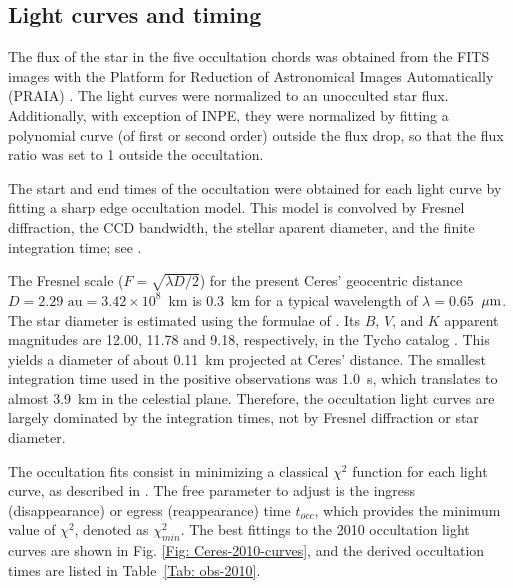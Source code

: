 \documentclass[useAMS,usenatbib]{mn2e}
\begin{document}
\subsection{Light curves and timing \label{Sec: light-curve-2010}}

The flux of the star in the five occultation chords was obtained from the FITS images with the Platform for Reduction of Astronomical Images Automatically (PRAIA) \citep{2011gfun.conf...85A}. The light curves were normalized to an unocculted star flux. Additionally, with exception of INPE, they were normalized by fitting a polynomial curve (of first or second order) outside the flux drop, so that the flux ratio was set to 1 outside the occultation.

The start and end times of the occultation were obtained for each light curve by fitting a sharp edge occultation model. This model is convolved by Fresnel diffraction, the CCD bandwidth, the stellar aparent diameter, and the finite integration time; see \cite{Widemann2009}.

The Fresnel scale ($F = \sqrt{\lambda D/2}$) for the present Ceres' geocentric distance $D = 2.29 \text{ au} = 3.42 \times 10^{8}$~km is 0.3~km for a typical wavelength of $\lambda = 0.65$~$\hbox{$\mu$m}$. The star diameter is estimated using the formulae of \cite{vanBelle1999}. Its $B$, $V$, and $K$ apparent magnitudes are 12.00, 11.78 and 9.18, respectively, in the Tycho catalog \citep{Hog2000}. This yields a diameter of about 0.11~km projected at Ceres' distance. The smallest integration time used in the positive observations was 1.0~s, which translates to almost 3.9~km in the celestial plane. Therefore, the occultation light curves are largely dominated by the integration times, not by Fresnel diffraction or star diameter.

The occultation fits consist in minimizing a classical $\chi^{2}$ function for each light curve, as described in \cite{Sicardy2011}. The free parameter to adjust is the ingress (disappearance) or egress (reappearance) time $t_{occ}$, which provides the minimum value of $\chi^{2}$, denoted as $\chi^{2}_{min}$. The best fittings to the 2010 occultation light curves are shown in Fig. \ref{Fig: Ceres-2010-curves}, and the derived occultation times are listed in Table~\ref{Tab: obs-2010}.
\end{document}
